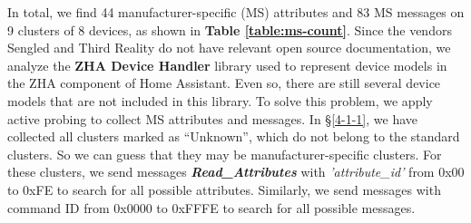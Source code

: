 \documentclass[10pt,journal,compsoc]{IEEEtran}
\begin{document}
\begin{table}[h]
    \setlength{\abovecaptionskip}{0pt}
    \setlength{\belowcaptionskip}{2pt}
    \caption{Number of Manufacturer-specific(MS) attr ibutes  (including hidden attributes) and MS ZCL messages found by ZVDetector on 8 devices in the testbed.}
    \begin{center}
    \end{center}
    \label{table:ms-count}
    \vspace{0cm}
\end{table}

In total, we find 44 manufacturer-specific (MS) attributes and 83 MS messages on 9 clusters of 8 devices, as shown in \textbf{Table \ref{table:ms-count}}. Since the vendors Sengled and Third Reality do not have relevant open source documentation, we analyze the \textbf{ZHA Device Handler} library used to represent device models in the ZHA component of Home Assistant. Even so, there are still several device models that are not included in this library. To solve this problem, we apply active probing to collect MS attributes and messages. In \S\ref{4-1-1}, we have collected all clusters marked as “Unknown”, which do not belong to the standard clusters. So we can guess that they may be manufacturer-specific clusters. For these clusters, we send messages \textbf{\textit{Read\_Attributes}} with \textit{'attribute\_id'} from 0x00 to 0xFE to search for all possible attributes. Similarly, we send messages with command ID from 0x0000 to 0xFFFE to search for all possible messages.
\end{document}

